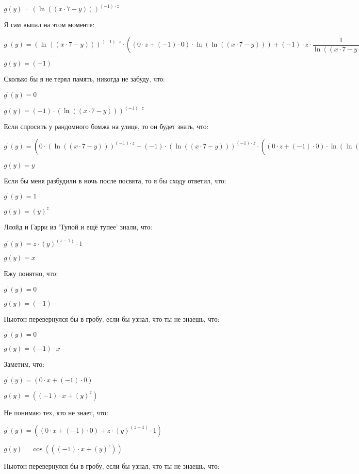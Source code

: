 \documentclass[a4paper,12pt]{article}
\begin{document}
\begin{flushleft}
$g(y) = (\ln {((x \cdot 7-y))})^{(-1) \cdot z}$

Я сам выпал на этом моменте:

$g^{'}(y) = (\ln {((x \cdot 7-y))})^{(-1) \cdot z} \cdot ((0 \cdot z+(-1) \cdot 0) \cdot \ln {(\ln {((x \cdot 7-y))})}+(-1) \cdot z \cdot  \dfrac{1}{\ln {((x \cdot 7-y))}}  \cdot  \dfrac{1}{(x \cdot 7-y)}  \cdot ((0 \cdot 7+x \cdot 0)-1))$

$g(y) = (-1)$

Сколько бы я не терял память, никогда не забуду, что:

$g^{'}(y) = 0$

$g(y) = (-1) \cdot (\ln {((x \cdot 7-y))})^{(-1) \cdot z}$

Если спросить у рандомного бомжа на улице, то он будет знать, что:

$g^{'}(y) = (0 \cdot (\ln {((x \cdot 7-y))})^{(-1) \cdot z}+(-1) \cdot (\ln {((x \cdot 7-y))})^{(-1) \cdot z} \cdot ((0 \cdot z+(-1) \cdot 0) \cdot \ln {(\ln {((x \cdot 7-y))})}+(-1) \cdot z \cdot  \dfrac{1}{\ln {((x \cdot 7-y))}}  \cdot  \dfrac{1}{(x \cdot 7-y)}  \cdot ((0 \cdot 7+x \cdot 0)-1)))$

$g(y) = y$

Если бы меня разбудили в ночь после посвята, то я бы сходу ответил, что:

$g^{'}(y) = 1$

$g(y) = (y)^{z}$

Ллойд и Гарри из 'Тупой и ещё тупее' знали, что:

$g^{'}(y) = z \cdot (y)^{(z-1)} \cdot 1$

$g(y) = x$

Ежу понятно, что:

$g^{'}(y) = 0$

$g(y) = (-1)$

Ньютон перевернулся бы в гробу, если бы узнал, что ты не знаешь, что:

$g^{'}(y) = 0$

$g(y) = (-1) \cdot x$

Заметим, что:

$g^{'}(y) = (0 \cdot x+(-1) \cdot 0)$

$g(y) = ((-1) \cdot x+(y)^{z})$

Не понимаю тех, кто не знает, что:

$g^{'}(y) = ((0 \cdot x+(-1) \cdot 0)+z \cdot (y)^{(z-1)} \cdot 1)$

$g(y) = \cos {(((-1) \cdot x+(y)^{z}))}$

Ньютон перевернулся бы в гробу, если бы узнал, что ты не знаешь, что:


\end{flushleft}
\end{document}
